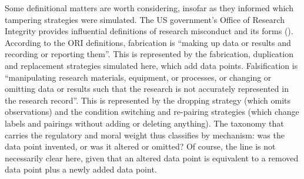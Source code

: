 \documentclass[
  nonatbib,
  authoryear,
  preprint]{elsarticle}
\begin{document}
Some definitional matters are worth considering, insofar as they
informed which tampering strategies were simulated. The US government's
Office of Research Integrity provides influential definitions of
research misconduct and its forms
(). According to
the ORI definitions, fabrication is ``making up data or results and
recording or reporting them''. This is represented by the fabrication,
duplication and replacement strategies simulated here, which add data
points. Falsification is ``manipulating research materials, equipment,
or processes, or changing or omitting data or results such that the
research is not accurately represented in the research record''. This is
represented by the dropping strategy (which omits observations) and the
condition switching and re-pairing strategies (which change labels and
pairings without adding or deleting anything). The taxonomy that carries
the regulatory and moral weight thus classifies by mechanism: was the
data point invented, or was it altered or omitted? Of course, the line
is not necessarily clear here, given that an altered data point is
equivalent to a removed data point plus a newly added data point.
\end{document}
